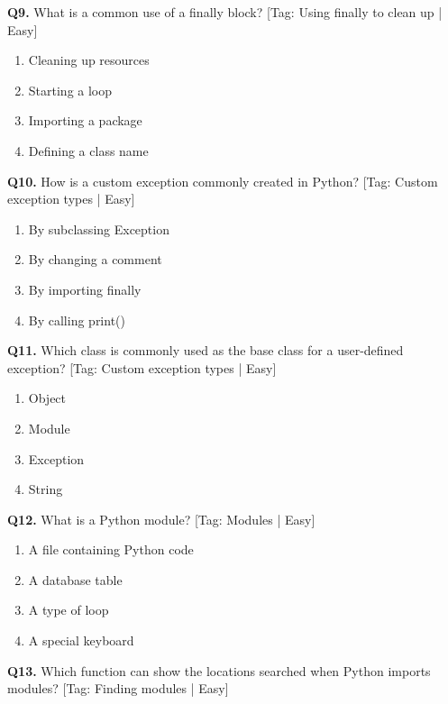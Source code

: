\vspace{2mm}
\noindent\textbf{Q9.} What is a common use of a finally block? \hfill [Tag: Using finally to clean up | Easy]
\begin{enumerate}[label=(\alph*),topsep=2pt,itemsep=1pt,partopsep=0pt,parsep=0pt]
    \item {Cleaning up resources}
    \item {Starting a loop}
    \item {Importing a package}
    \item {Defining a class name}
\end{enumerate}
\vspace{2mm}
\noindent\textbf{Q10.} How is a custom exception commonly created in Python? \hfill [Tag: Custom exception types | Easy]
\begin{enumerate}[label=(\alph*),topsep=2pt,itemsep=1pt,partopsep=0pt,parsep=0pt]
    \item {By subclassing Exception}
    \item {By changing a comment}
    \item {By importing finally}
    \item {By calling print()}
\end{enumerate}
\vspace{2mm}
\noindent\textbf{Q11.} Which class is commonly used as the base class for a user-defined exception? \hfill [Tag: Custom exception types | Easy]
\begin{enumerate}[label=(\alph*),topsep=2pt,itemsep=1pt,partopsep=0pt,parsep=0pt]
    \item {Object}
    \item {Module}
    \item {Exception}
    \item {String}
\end{enumerate}
\vspace{2mm}
\noindent\textbf{Q12.} What is a Python module? \hfill [Tag: Modules | Easy]
\begin{enumerate}[label=(\alph*),topsep=2pt,itemsep=1pt,partopsep=0pt,parsep=0pt]
    \item {A file containing Python code}
    \item {A database table}
    \item {A type of loop}
    \item {A special keyboard}
\end{enumerate}
\vspace{2mm}
\noindent\textbf{Q13.} Which function can show the locations searched when Python imports modules? \hfill [Tag: Finding modules | Easy]
